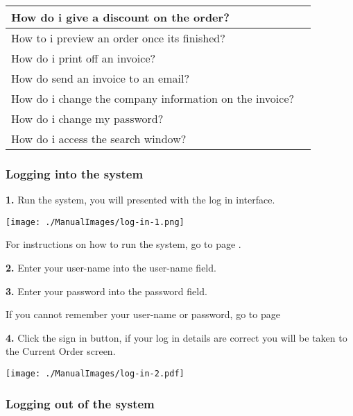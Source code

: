\begin{center}
\begin{longtable}{|p{8cm}|p{3cm}|}
	How do i give a discount on the order? &  \pageref{fig:Applying a Discount to an Order} \\ \hline
	How to i preview an order once its finished?&  \pageref{fig:Previewing the invoice} \\ \hline
	How do i print off an invoice?&  \pageref{fig:Printing an invoice} \\ \hline
	How do send an invoice to an email?&  \pageref{fig:Emailing an invoice} \\ \hline
	How do i change the company information on the invoice? &  \pageref{fig:Changing information on the invoice} \\ \hline
	How do i change my password?&  \pageref{fig:Changing your Password} \\ \hline
	How do i access the search window?&  \pageref{fig:Accessing the search window} \\ \hline
	\end{longtable}
\end{center}

\pagebreak

\subsubsection{Logging into the system}
\label{fig:Logging into the system}

\textbf{1.} Run the system, you will presented with the log in interface.
 
\texttt{[image: ./ManualImages/log-in-1.png]}
  
For instructions on how to run the system, go to page \pageref{fig:Running the System}.

\textbf{2.} Enter your user-name into the user-name field.

\textbf{3.} Enter your password into the password field.

If you cannot remember your user-name or password, go to page \pageref{fig:Forgetting Your User-name or Password}

\textbf{4.} Click the sign in button, if your log in details are correct you will be taken to the Current Order screen.

\texttt{[image: ./ManualImages/log-in-2.pdf]}

\pagebreak
\subsubsection{Logging out of the system}
\label{fig:Logging out of the system}


